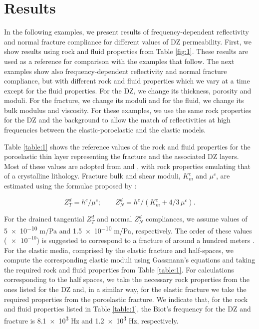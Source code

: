 \documentclass[draft]{agujournal2019}
\begin{document}
\section{Results}
In  the following examples, we present results of frequency-dependent reflectivity and normal fracture compliance for different values of DZ permeability. First, we show results using rock and fluid properties from Table \ref{fig:1}. These results are used as a reference for comparison with the examples that follow. The next examples show also frequency-dependent reflectivity and normal fracture compliance, but with different rock and fluid  properties which we vary at a time except for the fluid properties. For the DZ, we change its thickness, porosity and moduli. For the fracture, we change its moduli and for the fluid, we change its bulk modulus and viscosity. For these examples, we  use the same rock properties for the DZ and the background to allow the match of reflectivities at high frequencies between the elastic-poroelastic and the elastic models.

Table \ref{table:1} shows the reference values of the rock and fluid properties for the poroelastic thin layer representing the fracture and the associated DZ layers. Most of these values are adopted from   and , with rock properties emulating that of a crystalline lithology. Fracture bulk and shear moduli, $K_{m}^c$ and $\mu^c$, are estimated using the formulae proposed by :
\begin{linenomath*}
\begin{equation} \label{Eq.24}
Z_T^d=h^c/\mu^c ; \qquad Z_N^d=h^c/(K_{m}^c + 4/3 \, \mu^c).
\end{equation}
\end{linenomath*}
For the drained tangential $Z_T^d$ and normal $Z_N^d$ compliances, we assume values of  \num{5e-10} m/Pa and \num{1.5e-10} m/Pa, respectively. The order of these values ($\num {e-10}$) is suggested to correspond to a fracture of around a hundred meters \cite{Hobday2012}.
For the elastic media, comprised by the elastic fracture and half-spaces, we compute the corresponding elastic moduli using Gassmann's equations \cite{Gassmann1951} and taking the required rock and fluid properties from Table \ref{table:1}. For calculations corresponding to the half spaces, we take the necessary rock properties from the ones listed for the DZ and, in a similar way, for the elastic fracture we take the required properties from the poroelastic fracture. We indicate that, for the rock and fluid properties listed in Table \ref{table:1}, the Biot's frequency for the DZ and fracture is \num{8.1e3} Hz and \num{1.2e3} Hz, respectively.
\end{document}
